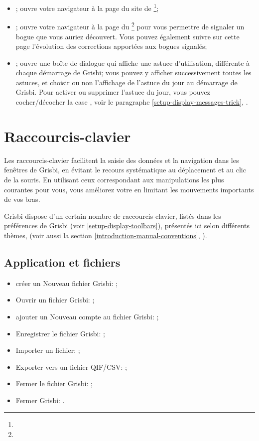 \begin{itemize}
	\item {}; ouvre votre navigateur à la page du site de \footnote{\urlGrisbi{}};
	\item {}; ouvre votre navigateur à la page du \footnote{\urlBugTracker{}} pour vous permettre de signaler un bogue que vous auriez découvert. Vous pouvez également suivre sur cette page l'évolution des corrections apportées aux bogues signalés;
	\item {}; ouvre une boîte de dialogue qui affiche une astuce d'utilisation, différente à chaque démarrage de Grisbi; vous pouvez y afficher successivement toutes les astuces, et choisir ou non l'affichage de l'astuce du jour au démarrage de Grisbi. Pour activer ou supprimer l'astuce du jour, vous pouvez cocher/décocher la case , voir le paragraphe \vref{setup-display-messages-trick}, .
\end{itemize}


\section{Raccourcis-clavier\label{home-shortcuts}}


Les raccourcis-clavier facilitent la saisie des données et la navigation dans les fenêtres de Grisbi, en évitant le recours systématique au déplacement et au clic de la souris. En utilisant ceux correspondant aux manipulations les plus courantes pour vous, vous améliorez votre  en limitant les mouvements importants de vos bras.
 
Grisbi dispose d'un certain nombre de raccourcis-clavier, listés dans les préférences de Grisbi (voir \vref{setup-display-toolbars}), présentés ici selon différents thèmes, (voir aussi la section \vref{introduction-manual-conventions}, ).


\subsection{Application et fichiers}

\begin{itemize}
	\item créer un Nouveau fichier Grisbi: ;
	\item Ouvrir un fichier Grisbi: ;
	\item ajouter un Nouveau compte au fichier Grisbi: ;
	\item Enregistrer le fichier Grisbi: ;
	\item Importer un fichier: ;
	\item Exporter vers un fichier \gls{QIF}/\gls{CSV}: ;
	\item Fermer le fichier Grisbi: ;
	\item Fermer Grisbi: .
\end{itemize}


